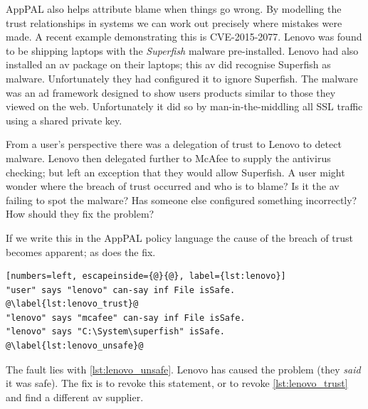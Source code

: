 \documentclass[twoside,letterpaper]{soups}
\begin{document}
AppPAL also helps attribute blame when things go wrong.
By modelling the trust relationships in systems we can work out precisely where mistakes were made.
A recent example demonstrating this is \textsc{CVE-2015-2077}.
Lenovo was found to be shipping laptops with the \emph{Superfish} malware pre-installed.
Lenovo had also installed an \ac{av} package on their laptops; this \ac{av} did recognise Superfish as malware.
Unfortunately they had configured it to ignore Superfish.
The malware was an ad framework designed to show users products similar to those they viewed on the web.
Unfortunately it did so by man-in-the-middling all SSL traffic using a shared private key.

From a user's perspective there was a delegation of trust to Lenovo to detect malware.
Lenovo then delegated further to McAfee to supply the antivirus checking; but left an exception that they would allow Superfish.
A user might wonder where the breach of trust occurred and who is to blame?
Is it the \ac{av} failing to spot the malware?
Has someone else configured something incorrectly?
How should they fix the problem?

If we write this in the AppPAL policy language the cause of the breach of trust becomes apparent; as does the fix.
\begin{lstlisting}[numbers=left, escapeinside={@}{@}, label={lst:lenovo}]
"user" says "lenovo" can-say inf File isSafe. @\label{lst:lenovo_trust}@
"lenovo" says "mcafee" can-say inf File isSafe.
"lenovo" says "C:\System\superfish" isSafe. @\label{lst:lenovo_unsafe}@
\end{lstlisting}
The fault lies with \autoref{lst:lenovo_unsafe}.
Lenovo has caused the problem (they \emph{said} it was safe).
The fix is to revoke this statement, or to revoke \autoref{lst:lenovo_trust} and find a different \ac{av} supplier.
\end{document}
